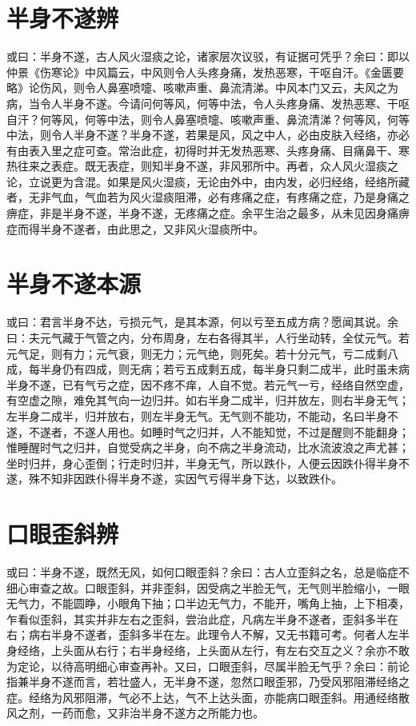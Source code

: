 \documentclass[a4paper,12pt,UTF8,twoside]{ctexbook}
\begin{document}
	\section{半身不遂辨}
	或曰：半身不遂，古人风火湿痰之论，诸家层次议驳，有证据可凭乎？余曰：即以仲景《伤寒论》中风篇云，中风则令人头疼身痛，发热恶寒，干呕自汗。《金匮要略》论伤风，则令人鼻塞喷嚏、咳嗽声重、鼻流清涕。中风本门又云，夫风之为病，当令人半身不遂。今请问何等风，何等中法，令人头疼身痛、发热恶寒、干呕自汗？何等风，何等中法，则令人鼻塞喷嚏、咳嗽声重、鼻流清涕？何等风，何等中法，则令人半身不遂？半身不遂，若果是风，风之中人，必由皮肤入经络，亦必有由表入里之症可查。常治此症，初得时并无发热恶寒、头疼身痛、目痛鼻干、寒热往来之表症。既无表症，则知半身不遂，非风邪所中。再者，众人风火湿痰之论，立说更为含混。如果是风火湿痰，无论由外中，由内发，必归经络，经络所藏者，无非气血，气血若为风火湿痰阻滞，必有疼痛之症，有疼痛之症，乃是身痛之痹症，非是半身不遂，半身不遂，无疼痛之症。余平生治之最多，从未见因身痛痹症而得半身不遂者，由此思之，又非风火湿痰所中。
	\section{半身不遂本源}
	或曰：君言半身不达，亏损元气，是其本源，何以亏至五成方病？愿闻其说。余曰：夫元气藏于气管之内，分布周身，左右各得其半，人行坐动转，全仗元气。若元气足，则有力；元气衰，则无力；元气绝，则死矣。若十分元气，亏二成剩八成，每半身仍有四成，则无病；若亏五成剩五成，每半身只剩二成半，此时虽未病半身不遂，已有气亏之症，因不疼不痒，人自不觉。若元气一亏，经络自然空虚，有空虚之隙，难免其气向一边归并。如右半身二成半，归并放左，则右半身无气；左半身二成半，归并放右，则左半身无气。无气则不能功，不能动，名曰半身不遂，不遂者，不遂人用也。如睡时气之归并，人不能知觉，不过是醒则不能翻身；惟睡醒时气之归并，自觉受病之半身，向不病之半身流动，比水流波浪之声尤甚；坐时归并，身心歪倒；行走时归并，半身无气，所以跌仆，人便云因跌仆得半身不遂，殊不知非因跌仆得半身不遂，实因气亏得半身下达，以致跌仆。
	\section{口眼歪斜辨}
	或曰：半身不遂，既然无风，如何口眼歪斜？余曰：古人立歪斜之名，总是临症不细心审查之故。口眼歪斜，并非歪斜，因受病之半脸无气，无气则半脸缩小，一眼无气力，不能圆睁，小眼角下抽；口半边无气力，不能开，嘴角上抽，上下相凑，乍看似歪斜，其实并非左右之歪斜，尝治此症，凡病左半身不遂者，歪斜多半在右；病右半身不遂者，歪斜多半在左。此理令人不解，又无书籍可考。何者人左半身经络，上头面从右行；右半身经络，上头面从左行，有左右交互之义？余亦不敢为定论，以待高明细心审查再补。又曰，口眼歪斜，尽属半脸无气乎？余曰：前论指兼半身不遂而言，若壮盛人，无半身不遂，忽然口眼歪邪，乃受风邪阻滞经络之症。经络为风邪阻滞，气必不上达，气不上达头面，亦能病口眼歪斜。用通经络散风之剂，一药而愈，又非治半身不遂方之所能力也。
\end{document}
